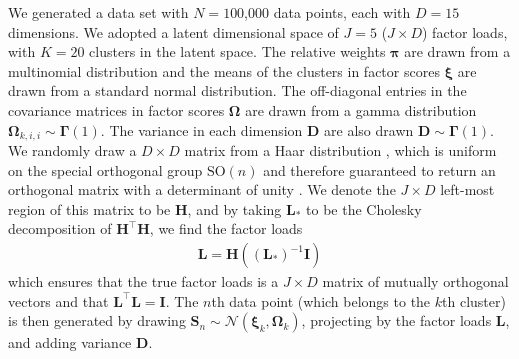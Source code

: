 \documentclass[twocolumn]{aastex62}
\newcommand{\vect}[1]{\boldsymbol{\mathbf{#1}}}
\renewcommand{\vec}[1]{\vect{#1}}
\newcommand{\weight}{\pi}
\newcommand{\transpose}{^\intercal}
\newcommand{\eye}{\textbf{I}}
\newcommand{\factorloads}{\textbf{L}}
\newcommand{\factorscores}{\textbf{S}}
\newcommand{\specificvariance}{\vec{D}}
\newcommand{\scoremeans}{\vec\xi}
\newcommand{\scorecovs}{\vec\Omega}
\newcommand{\NumData}{N}
\newcommand{\NumDimensions}{D}
\newcommand{\numdata}{n}
\newcommand{\NumLatentFactors}{J}
\newcommand{\NumComponents}{K}
\newcommand{\numcomponents}{k}
\begin{document}
We generated a data set with ${\NumData = 1}$00,000 data points, each with
$\NumDimensions = 15$ dimensions. We adopted a latent dimensional space of 
$\NumLatentFactors = 5$ ($\NumLatentFactors \times \NumDimensions$) factor loads, 
with $\NumComponents = 20$ clusters in the latent space. The relative weights $\vec\weight$
are drawn from a multinomial distribution and the means of the clusters
in factor scores $\scoremeans$ are drawn from a standard normal
distribution. The off-diagonal entries in the covariance matrices in factor scores $\scorecovs$ are drawn from a gamma distribution $\scorecovs_{\numcomponents,i,i} \sim \vec\Gamma\left(1\right)$. The variance in 
each dimension $\specificvariance$ are also drawn $\specificvariance \sim \vec\Gamma\left(1\right)$.
We randomly draw a  $\NumDimensions \times \NumDimensions$ matrix from a Haar distribution \citep{Haar:1933},
which is uniform on the special orthogonal group $\textrm{SO}(n)$ and therefore guaranteed to return an orthogonal
matrix with a determinant of unity \citep{Stewart:1980}.
We denote the $\NumLatentFactors \times \NumDimensions$ left-most region of this
matrix to be $\mathbf{H}$, and by taking $\factorloads_\ast$ to be the Cholesky decomposition of $\mathbf{H}\transpose \mathbf{H}$, we find the factor loads
\begin{eqnarray}
 	\factorloads = \mathbf{H}\left(\left(\factorloads_\ast\right)^{-1}\eye\right)
\end{eqnarray}
\noindent{}which ensures that the true factor loads is a $\NumLatentFactors \times \NumDimensions$
matrix of mutually orthogonal vectors and that $\factorloads\transpose \factorloads = \eye$.
The $\numdata$th data point (which belongs to the $\numcomponents$th cluster) is then
generated by drawing $\factorscores_{\numdata} \sim \mathcal{N}(\scoremeans_\numcomponents,\scorecovs_\numcomponents)$, projecting by the factor loads $\factorloads$, and adding variance $\specificvariance$.
\end{document}

